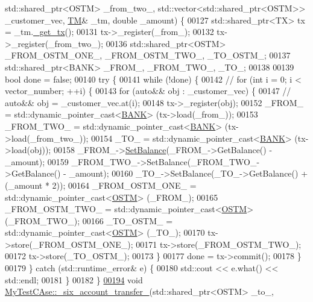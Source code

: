 \begin{DoxyCode}
      std::shared\_ptr<OSTM> \_from\_two\_, std::vector<std::shared\_ptr<OSTM>> \_customer\_vec, \hyperlink{class_t_m}{TM}& \_tm, \textcolor{keywordtype}{double} \_amount) \{
00127     std::shared\_ptr<TX> tx = \_tm.\hyperlink{class_t_m_a41cb0226cc4080c931651b13f74a0075_a41cb0226cc4080c931651b13f74a0075}{\_get\_tx}();
00131     tx->\_register(\_from\_);
00132     tx->\_register(\_from\_two\_);
00136     std::shared\_ptr<OSTM> \_FROM\_OSTM\_ONE\_, \_FROM\_OSTM\_TWO\_, \_TO\_OSTM\_;
00137     std::shared\_ptr<BANK> \_FROM\_, \_FROM\_TWO\_, \_TO\_;
00138 
00139     \textcolor{keywordtype}{bool} done = \textcolor{keyword}{false};
00140     \textcolor{keywordflow}{try} \{
00141         \textcolor{keywordflow}{while} (!done) \{
00142             \textcolor{comment}{// for (int i = 0; i < vector\_number; ++i) \{}
00143             \textcolor{keywordflow}{for} (\textcolor{keyword}{auto}&& obj : \_customer\_vec) \{
00147                 \textcolor{comment}{// auto&& obj = \_customer\_vec.at(i);}
00148                 tx->\_register(obj);
00152                 \_FROM\_ = std::dynamic\_pointer\_cast<\hyperlink{class_b_a_n_k}{BANK}> (tx->load(\_from\_));
00153                 \_FROM\_TWO\_ = std::dynamic\_pointer\_cast<\hyperlink{class_b_a_n_k}{BANK}> (tx->load(\_from\_two\_));
00154                 \_TO\_ = std::dynamic\_pointer\_cast<\hyperlink{class_b_a_n_k}{BANK}> (tx->load(obj));
00158                 \_FROM\_->\hyperlink{class_b_a_n_k_ae3e45b407bf8ec7175662442ea24b7c0_ae3e45b407bf8ec7175662442ea24b7c0}{SetBalance}(\_FROM\_->GetBalance() - \_amount);
00159                 \_FROM\_TWO\_->SetBalance(\_FROM\_TWO\_->GetBalance() - \_amount);
00160                 \_TO\_->SetBalance(\_TO\_->GetBalance() + (\_amount * 2));
00164                 \_FROM\_OSTM\_ONE\_ = std::dynamic\_pointer\_cast<\hyperlink{class_o_s_t_m}{OSTM}> (\_FROM\_);
00165                 \_FROM\_OSTM\_TWO\_ = std::dynamic\_pointer\_cast<\hyperlink{class_o_s_t_m}{OSTM}> (\_FROM\_TWO\_);
00166                 \_TO\_OSTM\_ = std::dynamic\_pointer\_cast<\hyperlink{class_o_s_t_m}{OSTM}> (\_TO\_);
00170                 tx->store(\_FROM\_OSTM\_ONE\_);
00171                 tx->store(\_FROM\_OSTM\_TWO\_);
00172                 tx->store(\_TO\_OSTM\_);
00173             \}
00177             done = tx->commit();
00178         \}
00179     \} \textcolor{keywordflow}{catch} (std::runtime\_error& e) \{
00180         std::cout << e.what() << std::endl;
00181     \}
00182 \}
\hypertarget{_my_test_c_ase_8cpp_source.tex_l00194}{}\hyperlink{class_my_test_c_ase_a72ce436fb3c78c3d76b6c48a5a2e6a76_a72ce436fb3c78c3d76b6c48a5a2e6a76}{00194} \textcolor{keywordtype}{void} \hyperlink{class_my_test_c_ase_a72ce436fb3c78c3d76b6c48a5a2e6a76_a72ce436fb3c78c3d76b6c48a5a2e6a76}{MyTestCAse::\_six\_account\_transfer\_}(std::shared\_ptr<OSTM> \_to\_, 

\end{DoxyCode}
